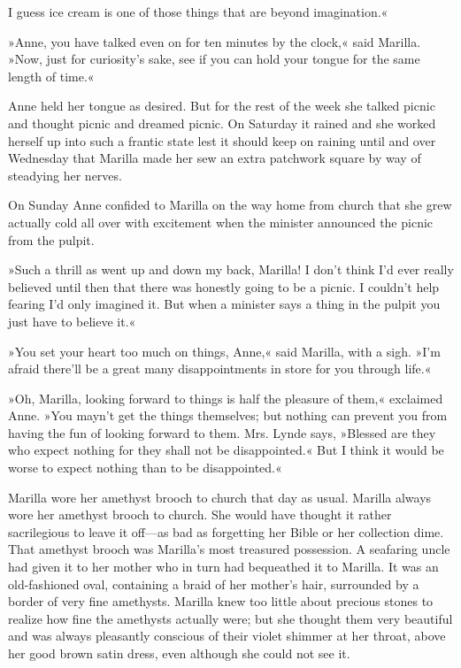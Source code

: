 I guess ice cream is one of those things that are beyond imagination.«

»Anne, you have talked even on for ten minutes by the clock,« said Marilla. »Now, just for curiosity's sake, see if you can hold your tongue for the same length of time.«

Anne held her tongue as desired. But for the rest of the week she talked picnic and thought picnic and dreamed picnic. On Saturday it rained and she worked herself up into such a frantic state lest it should keep on raining until and over Wednesday that Marilla made her sew an extra patchwork square by way of steadying her nerves.

On Sunday Anne confided to Marilla on the way home from church that she grew actually cold all over with excitement when the minister announced the picnic from the pulpit.

»Such a thrill as went up and down my back, Marilla! I don't think I'd ever really believed until then that there was honestly going to be a picnic. I couldn't help fearing I'd only imagined it. But when a minister says a thing in the pulpit you just have to believe it.«

»You set your heart too much on things, Anne,« said Marilla, with a sigh. »I'm afraid there'll be a great many disappointments in store for you through life.«

»Oh, Marilla, looking forward to things is half the pleasure of them,« exclaimed Anne. »You mayn't get the things themselves; but nothing can prevent you from having the fun of looking forward to them. Mrs. Lynde says, »Blessed are they who expect nothing for they shall not be disappointed.« But I think it would be worse to expect nothing than to be disappointed.«

Marilla wore her amethyst brooch to church that day as usual. Marilla always wore her amethyst brooch to church. She would have thought it rather sacrilegious to leave it off—as bad as forgetting her Bible or her collection dime. That amethyst brooch was Marilla's most treasured possession. A seafaring uncle had given it to her mother who in turn had bequeathed it to Marilla. It was an old-fashioned oval, containing a braid of her mother's hair, surrounded by a border of very fine amethysts. Marilla knew too little about precious stones to realize how fine the amethysts actually were; but she thought them very beautiful and was always pleasantly conscious of their violet shimmer at her throat, above her good brown satin dress, even although she could not see it.

